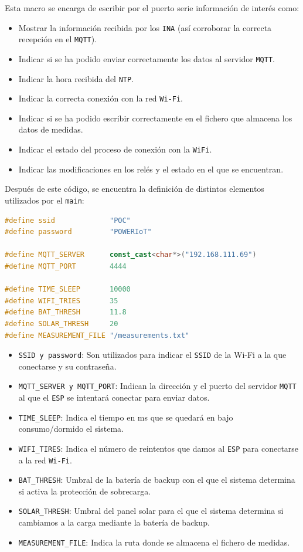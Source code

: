 Esta macro se encarga de escribir por el puerto serie información de interés como:
\begin{itemize}
    \item Mostrar la información recibida por los \texttt{INA} (así corroborar la correcta recepción en el \texttt{MQTT}).
    \item Indicar si se ha podido enviar correctamente los datos al servidor \texttt{MQTT}.
    \item Indicar la hora recibida del \texttt{NTP}.
    \item Indicar la correcta conexión con la red \texttt{Wi-Fi}.
    \item Indicar si se ha podido escribir correctamente en el fichero que almacena los datos de medidas.
    \item Indicar el estado del proceso de conexión con la \texttt{WiFi}.
    \item Indicar las modificaciones en los relés y el estado en el que se encuentran.
\end{itemize}

Después de este código, se encuentra la definición de distintos elementos utilizados por el \texttt{main}:
\begin{lstlisting}[captionpos=b, caption={Constantes de \texttt{MAIN\_POWER}}, language=c++]
#define ssid             "POC"
#define password         "POWERIoT"

#define MQTT_SERVER      const_cast<char*>("192.168.111.69")
#define MQTT_PORT        4444

#define TIME_SLEEP       10000
#define WIFI_TRIES       35
#define BAT_THRESH       11.8
#define SOLAR_THRESH     20
#define MEASUREMENT_FILE "/measurements.txt"
\end{lstlisting}

\begin{itemize}
    \item \texttt{SSID y password}: Son utilizados para indicar el \texttt{SSID} de la Wi-Fi a la que conectarse y su contraseña. 
    \item \texttt{MQTT\_SERVER y MQTT\_PORT}: Indican la dirección y el puerto del servidor \texttt{MQTT} al que el \texttt{ESP} se intentará conectar para enviar datos.
    \item \texttt{TIME\_SLEEP}: Indica el tiempo en ms que se quedará en bajo consumo/dormido el sistema.
    \item \texttt{WIFI\_TIRES}: Indica el número de reintentos que damos al \texttt{ESP} para conectarse a la red \texttt{Wi-Fi}.
    \item \texttt{BAT\_THRESH}: Umbral de la batería de backup con el que el sistema determina si activa la protección de sobrecarga.
    \item \texttt{SOLAR\_THRESH}: Umbral del panel solar para el que el sistema determina si cambiamos a la carga mediante la batería de backup.
    \item \texttt{MEASUREMENT\_FILE}: Indica la ruta donde se almacena el fichero de medidas.
\end{itemize}

